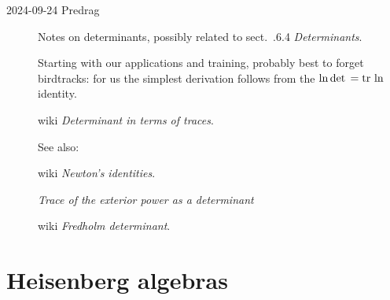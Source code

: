 \begin{description}
\item[2024-09-24 Predrag] Notes on determinants, possibly related to 
 {sect.~.6.4} {\em Determinants}.

Starting with our applications and training, probably best to forget birdtracks:
for us the simplest derivation follows from the
$\ln \mathrm{det}\, = \mathrm{tr}\, \ln$ identity.

 {wiki {\em Determinant in terms of traces}}.

See also:

 {wiki {\em Newton's identities}}.

{{\em Trace of the exterior power as a determinant}}

 {wiki {\em Fredholm determinant}}.


\end{description}

\section{Heisenberg algebras}
\label{s-Heisenberg}

